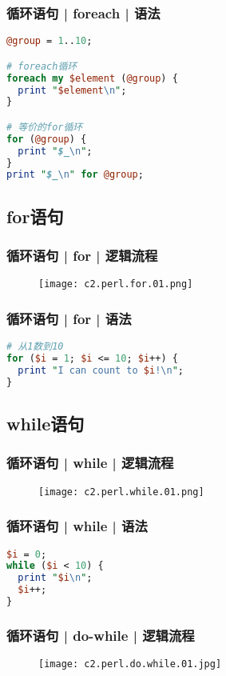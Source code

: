 \begin{frame}[fragile]
  \frametitle{循环语句 | foreach | \alert{语法}}
\begin{lstlisting}[language=Perl]
@group = 1..10;

# foreach循环
foreach my $element (@group) {
  print "$element\n";
}

# 等价的for循环
for (@group) {
  print "$_\n";
}
print "$_\n" for @group;
\end{lstlisting}
\end{frame}

\subsection{for语句}
\begin{frame}
  \frametitle{循环语句 | for | 逻辑流程}
  \begin{figure}
    \centering
    \texttt{[image: c2.perl.for.01.png]}
  \end{figure}
\end{frame}

\begin{frame}[fragile]
  \frametitle{循环语句 | for | \alert{语法}}
\begin{lstlisting}[language=Perl]
# 从1数到10
for ($i = 1; $i <= 10; $i++) {
  print "I can count to $i!\n";
}
\end{lstlisting}
\end{frame}

\subsection{while语句}
\begin{frame}
  \frametitle{循环语句 | while | 逻辑流程}
  \begin{figure}
    \centering
    \texttt{[image: c2.perl.while.01.png]}
  \end{figure}
\end{frame}

\begin{frame}[fragile]
  \frametitle{循环语句 | while | \alert{语法}}
\begin{lstlisting}[language=Perl]
$i = 0;
while ($i < 10) {
  print "$i\n";
  $i++;
}
\end{lstlisting}
\end{frame}

\begin{frame}
  \frametitle{循环语句 | do-while | 逻辑流程}
  \begin{figure}
    \centering
    \texttt{[image: c2.perl.do.while.01.jpg]}
  \end{figure}
\end{frame}

